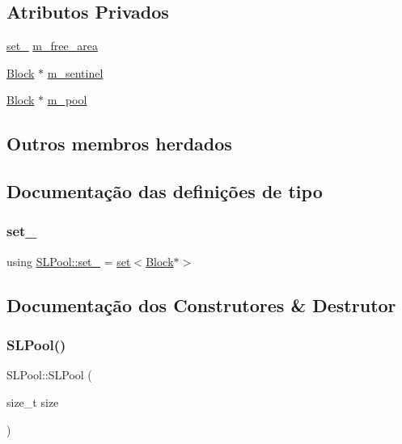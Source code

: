 \subsection*{Atributos Privados}
\begin{DoxyCompactItemize}
\item 
\hyperlink{classSLPool_a56a9012819984d5c7dcdd768482a5d37}{set\+\_\+} \hyperlink{classSLPool_a581aba69cb859a6a59a1d87cf14cbf85}{m\+\_\+free\+\_\+area}
\item 
\hyperlink{structSLPool_1_1Block}{Block} $\ast$ \hyperlink{classSLPool_a2c72962a10ee6bc7699602b5b79e775e}{m\+\_\+sentinel}
\item 
\hyperlink{structSLPool_1_1Block}{Block} $\ast$ \hyperlink{classSLPool_a7612411c05e5dd1fa06e612e7ffddca3}{m\+\_\+pool}
\end{DoxyCompactItemize}
\subsection*{Outros membros herdados}


\subsection{Documentação das definições de tipo}
\mbox{\label{classSLPool_a56a9012819984d5c7dcdd768482a5d37}} 
\subsubsection{\texorpdfstring{set\+\_\+}{set\_}}
{\footnotesize\ttfamily using \hyperlink{classSLPool_a56a9012819984d5c7dcdd768482a5d37}{S\+L\+Pool\+::set\+\_\+} =  \hyperlink{classset}{set}$<$\hyperlink{structSLPool_1_1Block}{Block}$\ast$$>$\hspace{0.3cm}{\ttfamily [private]}}



\subsection{Documentação dos Construtores \& Destrutor}
\mbox{\label{classSLPool_a9e445324d44fff6652cbb70fbd03a5f8}} 
\subsubsection{\texorpdfstring{S\+L\+Pool()}{SLPool()}}
{\footnotesize\ttfamily S\+L\+Pool\+::\+S\+L\+Pool (\begin{DoxyParamCaption}\item[{size\+\_\+t}]{size }\end{DoxyParamCaption})\hspace{0.3cm}{\ttfamily [explicit]}}



